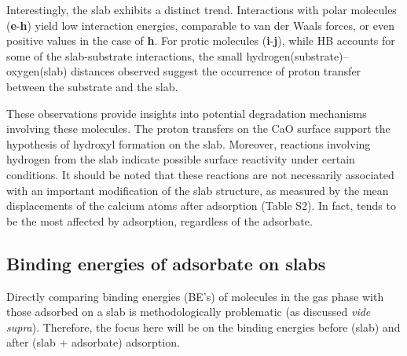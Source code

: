 \documentclass[%
aip,
amsmath,amssymb,
preprint,%
jcp,
showkeys,
]{revtex4-2}
\begin{document}
Interestingly, the  slab exhibits a distinct trend. Interactions with polar molecules (\textbf{e}-\textbf{h}) yield low interaction energies, comparable to van der Waals forces, or even positive values in the case of \textbf{h}. For protic molecules (\textbf{i}-\textbf{j}), while HB accounts for some of the slab-substrate interactions, the small hydrogen(substrate)--oxygen(slab) distances observed suggest the occurrence of proton transfer between the substrate and the slab.

These observations provide insights into potential degradation mechanisms involving these molecules. The proton transfers on the CaO surface support the hypothesis of hydroxyl formation on the slab. Moreover, reactions involving hydrogen from the  slab indicate possible surface reactivity under certain conditions.  It should be noted that these reactions are not necessarily associated with an important modification of the slab structure, as measured by the mean displacements of the calcium atoms after adsorption (Table S2). In fact,  tends to be the most affected by adsorption, regardless of the adsorbate.

\subsection{Binding energies of adsorbate on slabs}\label{sec:BE's}

\newcommand{\XPSsa}[2]{
	\begin{turnpage}
	\begin{figure}
		\centering
		\texttt{[image: Figure\#1]}
		\caption{Difference (dotted line) between the XPS spectra before (dashed line) and after (solid line) adsorption for compounds \textbf{#2} on various substrates, as computed using the \cpx{E_\infty} protocol. Letters indicate mean binding energies for bulk (``b"), surface (``s", with $\star$ marking the atom closest to the adsorbate), surface hydroxides (``h"), and different atoms of the adsorbate.}
		\label{fig:spectraXPSads#2}
	\end{figure}
\end{turnpage}
}

Directly comparing binding energies (BE's) of molecules in the gas phase with those adsorbed on a slab is methodologically problematic (as discussed \textit{vide supra}). Therefore, the focus here will be on the binding energies before (slab) and after (slab + adsorbate) adsorption.
\end{document}
